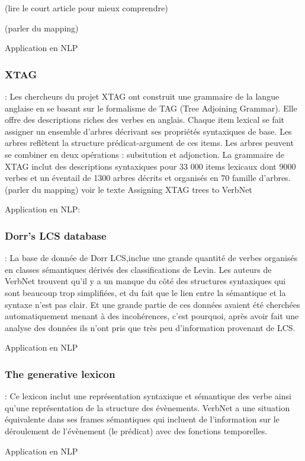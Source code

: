 (lire le court article pour mieux comprendre)

(parler du mapping)

Application en NLP

\subsubsection{XTAG} : Les chercheurs du projet XTAG ont construit une grammaire de la langue anglaise en se basant sur le formalisme de TAG (Tree Adjoining Grammar). Elle offre des descriptions riches des verbes en anglais. Chaque item lexical se fait assigner un ensemble d'arbres décrivant ses propriétés syntaxiques de base. Les arbres reflètent la structure prédicat-argument de ces items. Les arbres peuvent se combiner en deux opérations : subsitution et adjonction. La grammaire de XTAG inclut des descriptions syntaxiques pour 33 000 items lexicaux dont 9000 verbes et un éventail de 1300 arbres décrits et organisés en 70 famille d'arbres.
(parler du mapping)
voir le texte  Assigning XTAG trees to VerbNet

Application en NLP:

\subsubsection{Dorr's LCS database} : La base de donnée de Dorr LCS,inclue une grande quantité de verbes organisés en classes sémantiques dérivés des classifications de Levin. Les auteurs de VerbNet trouvent qu'il y a un manque du côté des structures syntaxiques qui sont beaucoup trop simplifiées, et du fait que le lien entre la sémantique et la syntaxe n'est pas clair. Et une grande partie de ces données avaient été cherchées automatiquement menant à des incohérences, c'est pourquoi, après avoir fait une analyse des données ils n'ont pris que très peu d'information provenant de LCS.

Application en NLP

\subsubsection{The generative lexicon} : Ce lexicon inclut une représentation syntaxique et sémantique des verbe ainsi qu'une représentation de la structure des évènements. VerbNet a une situation équivalente dans ses frames sémantiques qui incluent de l'information sur le déroulement de l'évènement (le prédicat) avec des fonctions temporelles.

Application en NLP

